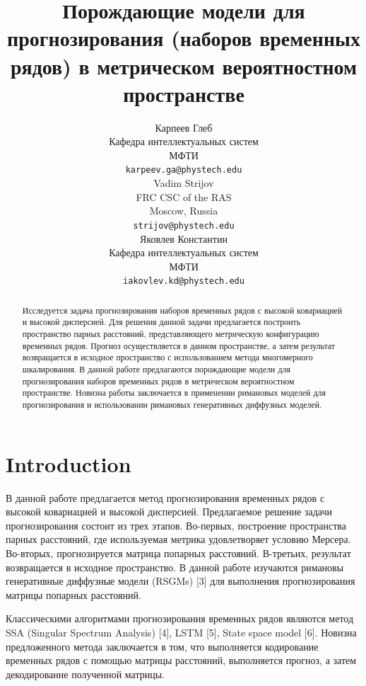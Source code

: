 \documentclass{article}
\title{Порождающие модели для прогнозирования (наборов временных рядов) в метрическом вероятностном пространстве}
\author{ Карпеев Глеб \\
	Кафедра интеллектуальных систем\\
	МФТИ\\
	\texttt{karpeev.ga@phystech.edu} \\
	\And
	Vadim Strijov \\
	FRC CSC of the RAS\\
	Moscow, Russia\\
        \texttt{strijov@phystech.edu} \\
        \And
	Яковлев Константин \\
	Кафедра интеллектуальных систем\\
	МФТИ\\
	\texttt{iakovlev.kd@phystech.edu} \\
}
\date{}
\begin{document}
\maketitle

\begin{abstract}
	Исследуется задача прогнозирования наборов временных рядов с высокой ковариацией и высокой дисперсией. Для решения данной задачи предлагается построить пространство парных расстояний, представляющего метрическую конфигурацию временных рядов. Прогноз осуществляется в данном пространстве, а затем результат возвращается в исходное пространство с использованием метода многомерного шкалирования. В данной работе предлагаются порождающие модели для прогнозирования наборов временных рядов в метрическом вероятностном пространстве. Новизна работы заключается в применении римановых моделей для прогнозирования и использовании римановых генеративных диффузных моделей.

\end{abstract}



\section{Introduction}

В данной работе предлагается метод прогнозирования временных рядов с высокой ковариацией и высокой дисперсией. Предлагаемое решение задачи прогнозирования состоит из трех этапов. Во-первых, построение пространства парных расстояний, где используемая метрика удовлетворяет условию Мерсера. Во-вторых, прогнозируется матрица попарных расстояний. В-третьих, результат возвращается в исходное пространство.  В данной работе изучаются римановы генеративные диффузные модели (RSGMs) [3] для выполнения прогнозирования матрицы попарных расстояний.



Классическими алгоритмами прогнозирования временных рядов являются метод SSA (Singular Spectrum Analysis) [4], LSTM [5], State space model [6]. Новизна предложенного метода заключается в том, что выполняется кодирование временных рядов с помощью матрицы расстояний, выполняется прогноз, а затем декодирование полученной матрицы.
\end{document}
